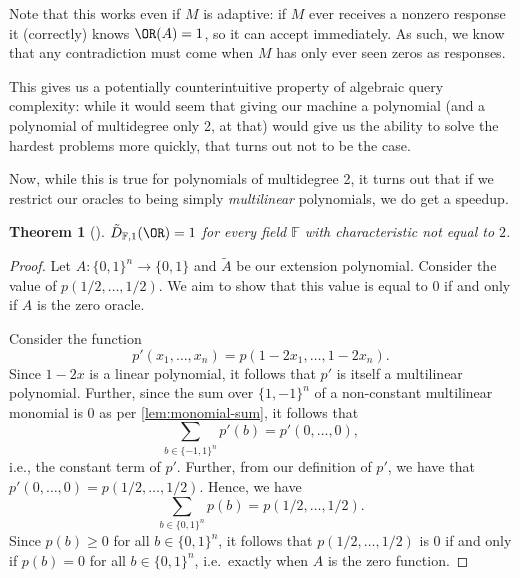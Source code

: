 \documentclass[english,12pt]{reedthesis}
\theoremstyle{plain}
\newtheorem{thm}{Theorem}[section]
\theoremstyle{definition}
\theoremstyle{remark}
\begin{document}
Note that this works even if $M$ is adaptive: if $M$ ever receives a nonzero
response it (correctly) knows $\OR(A) = 1$, so it can accept immediately. As
such, we know that any contradiction must come when $M$ has only ever seen zeros
as responses.

This gives us a potentially counterintuitive property of algebraic query
complexity: while it would seem that giving our machine a polynomial (and a
polynomial of multidegree only 2, at that) would give us the ability to solve
the hardest problems more quickly, that turns out not to be the case.

Now, while this is true for polynomials of multidegree 2, it turns out that if
we restrict our oracles to being simply \emph{multilinear} polynomials, we do
get a speedup.

\begin{thm}[{\cite[Thm. 3]{JKRS09}}]\label{thm:or-multilinear}
  $\tilde{D}_{\mathbb{F},1}(\OR) = 1$ for every field $\mathbb{F}$ with
  characteristic not equal to $2$.
\end{thm}

\begin{proof}
  Let $A\colon \{0, 1\}^{n} \rightarrow \{0, 1\}$ and $\tilde{A}$ be our extension
  polynomial. Consider the value of $p(1/2, \ldots, 1/2)$. We aim to show that this
  value is equal to $0$ if and only if $A$ is the zero oracle.

  Consider the function
  \begin{equation}
    p'(x_{1}, \ldots, x_{n}) = p(1 - 2x_{1}, \ldots, 1 - 2x_{n}).
  \end{equation}
  Since $1 - 2x$ is a linear polynomial, it follows that $p'$ is itself a
  multilinear polynomial. Further, since the sum over $\{1, -1\}^{n}$ of a
  non-constant multilinear monomial is 0 as per \cref{lem:monomial-sum}, it
  follows that
  \begin{equation}
    \sum_{b \in \{-1, 1\}^{n}}p'(b) = p'(0, \ldots, 0),
  \end{equation}
  i.e., the constant term of $p'$. Further, from our definition of $p'$, we have
  that $p'(0, \ldots, 0) = p(1/2, \ldots, 1/2)$. Hence, we have
  \begin{equation}
    \sum_{b \in \{0, 1\}^{n}}p(b) = p(1/2, \ldots, 1/2).
  \end{equation}
  Since $p(b) \ge 0$ for all $b \in \{0, 1\}^{n}$, it follows that $p(1/2, \ldots, 1/2)$
  is 0 if and only if $p(b) = 0$ for all $b \in \{0, 1\}^{n}$, i.e.\ exactly when
  $A$ is the zero function.
\end{proof}
\end{document}
